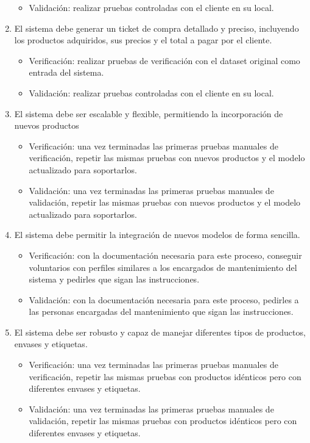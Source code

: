 \documentclass[
11pt, %
]{charter}
\begin{document}
\begin{enumerate}
\begin{itemize}
	\item Validación: realizar pruebas controladas con el cliente en su local.  
\end{itemize}
			\item El sistema debe generar un ticket de compra detallado y preciso, incluyendo los productos adquiridos, sus precios y el total a pagar por el cliente.
			\begin{itemize}
	\item Verificación: realizar pruebas de verificación con el dataset original como entrada del sistema.  
	\item Validación: realizar pruebas controladas con el cliente en su local.  
\end{itemize}
			\item El sistema debe ser escalable y flexible, permitiendo la incorporación de nuevos productos
			\begin{itemize}
	\item Verificación: una vez terminadas las primeras pruebas manuales de verificación, repetir las mismas pruebas con nuevos productos y el modelo actualizado para soportarlos.
	\item Validación: una vez terminadas las primeras pruebas manuales de validación, repetir las mismas pruebas con nuevos productos y el modelo actualizado para soportarlos.  
\end{itemize}
		\item El sistema debe permitir la integración de nuevos modelos de forma sencilla.
		\begin{itemize}
	\item Verificación: con la documentación necesaria para este proceso, conseguir voluntarios con perfiles similares a los encargados de mantenimiento del sistema y pedirles que sigan las instrucciones. 
	\item Validación: con la documentación necesaria para este proceso, pedirles a las personas encargadas del mantenimiento que sigan las instrucciones.
\end{itemize}
			\item El sistema debe ser robusto y capaz de manejar diferentes tipos de productos, envases y etiquetas.	
			\begin{itemize}
		\item Verificación: una vez terminadas las primeras pruebas manuales de verificación, repetir las mismas pruebas con productos idénticos pero con diferentes envases y etiquetas.
	\item Validación: una vez terminadas las primeras pruebas manuales de validación, repetir las mismas pruebas con productos idénticos pero con diferentes envases y etiquetas. 

\end{itemize}
\end{enumerate}
\end{document}
